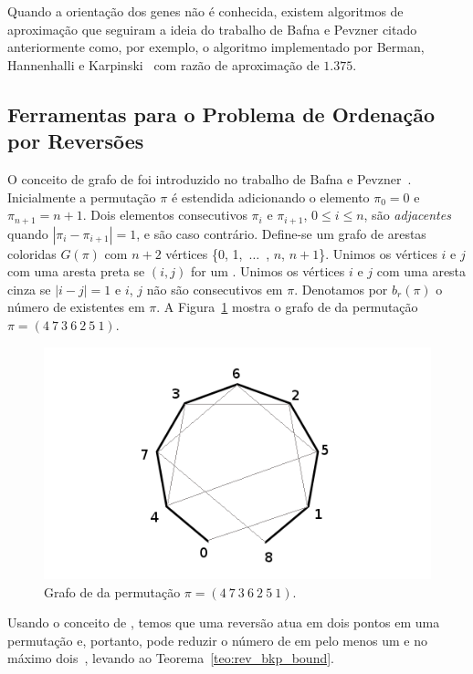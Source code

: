 Quando a orientação dos genes não é conhecida, existem algoritmos de
aproximação que seguiram a ideia do trabalho de Bafna e Pevzner citado
anteriormente como, por exemplo, o algoritmo implementado por Berman,
Hannenhalli e Karpinski~\cite{BermanHannenhalliKarpinski*2002} com
razão de aproximação de $1.375$.

\subsection{Ferramentas para o Problema de Ordenação por Reversões}
\label{subsec:toolrev}
O conceito de grafo de \bkp{} foi introduzido no trabalho de Bafna e
Pevzner~\cite{BafnaPevzner*1996}. Inicialmente a permutação $\pi$ é
estendida adicionando o elemento $\pi_{0} = 0$ e $\pi_{n+1} =
n+1$. Dois elementos consecutivos $\pi_{i}$ e $\pi_{i+1}$, $0 \le
i \le n$, são \textit{adjacentes} quando $|\pi_{i} - \pi_{i+1}| = 1$,
e são  caso contrário. Define-se um grafo de arestas
coloridas $G(\pi)$ com $n + 2$ vértices \{0, 1,~$\ldots$~, $n$, $n +
1$\}. Unimos os vértices $i$ e $j$ com uma aresta preta se $(i, j)$
for um . Unimos os vértices $i$ e $j$ com uma aresta
cinza se $|i - j| = 1$ e $i$, $j$ não são consecutivos em
$\pi$. Denotamos por $b_r(\pi)$ o número de \bkp{} existentes em
$\pi$. A Figura~\ref{fig:rev_grafo_bkp} mostra o grafo de \bkp{} da
permutação $\pi = (4~7~3~6~2~5~1)$.

\begin{figure}[h]
  \centering 
  \includegraphics[scale=0.6]{images/rev_grafo_bkp.png} 
  \caption{Grafo de \bkp{} da permutação $\pi = (4~7~3~6~2~5~1)$.}
  \label{fig:rev_grafo_bkp}
\end{figure}

Usando o conceito de \bkp{}, temos que uma reversão atua em dois
pontos em uma permutação e, portanto, pode reduzir o número de \bkp{}
em pelo menos um e no máximo dois~\cite{BafnaPevzner*1996}, levando ao
Teorema~\ref{teo:rev_bkp_bound}. 

